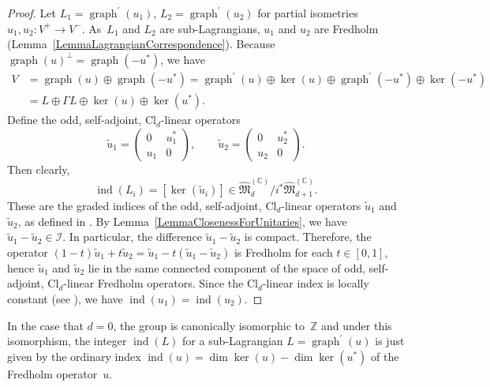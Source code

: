 \documentclass[pdftex]{sigma}
\numberwithin{equation}{section}
\DeclareMathOperator{\graph}{\mathrm{graph}}
\newcommand{\Z}{\mathbb{Z}}
\newcommand{\C}{\mathbb{C}}
\newcommand{\ind}{\operatorname{ind}}
\newcommand{\Cl}{\mathrm{Cl}}
\begin{document}
\begin{proof}
 Let $L_1 = \graph^\prime(u_1)$, $L_2 = \graph^\prime(u_2)$ for partial isometries $u_1, u_2 \colon V^+ \to V^-$.
 As~$L_1$ and $L_2$ are sub-Lagrangians, ${u}_1$ and ${u}_2$ are Fredholm (Lemma~\ref{LemmaLagrangianCorrespondence}).
 Because $\graph(u)^\perp = \graph(-u^*)$, we have
\begin{align*}
V &= \graph (u) \oplus \graph(-u^*) = \graph^\prime(u) \oplus \ker(u) \oplus \graph^\prime(-u^*) \oplus \ker(-u^*)\\
&= L \oplus \Gamma L \oplus \ker(u) \oplus \ker(u^*).
\end{align*}
 Define the odd, self-adjoint, $\Cl_d$-linear operators
 \begin{equation*}
 \tilde{u}_1 = \begin{pmatrix} 0 & u_1^* \\ u_1 & 0 \end{pmatrix}, \qquad \tilde{u}_2 = \begin{pmatrix} 0 & u_2^* \\ u_2 & 0 \end{pmatrix}.
 \end{equation*}
 Then clearly,
 \begin{equation*}
 \ind(L_i) = [\ker(\tilde{u}_i)] \in \hat{\mathfrak{M}}^{(\C)}_d / i^*\hat{\mathfrak{M}}^{(\C)}_{d+1}.
 \end{equation*}
 These are the graded indices of the odd, self-adjoint, $\Cl_d$-linear operators $\tilde{u}_1$ and $\tilde{u}_2$, as defined in \cite[Section~III.10]{LawsonMichelsohn}.
 By Lemma~\ref{LemmaClosenessForUnitaries}, we have $\tilde{u}_1 - \tilde{u}_2 \in \mathcal{I}$.
 In particular, the difference $\tilde{u}_1 - \tilde{u}_2$ is compact.
 Therefore, the operator $(1-t) \tilde{u}_1 + t \tilde{u}_2 = \tilde{u}_1 - t(\tilde{u}_1 - \tilde{u}_2)$ is Fredholm for each $t \in [0, 1]$, hence $\tilde{u}_1$ and $\tilde{u}_2$ lie in the same connected component of the space of odd, self-adjoint, $\Cl_d$-linear Fredholm operators.
 Since the $\Cl_d$-linear index is locally constant (see \cite[Proposition~III.10.6]{LawsonMichelsohn}), we have $\ind(u_1) = \ind(u_2)$.
\end{proof}

\begin{Example}
In the case that $d=0$, the group \smash{$\mathfrak{M}_0^{(\C)} / i^* \mathfrak{M}_1^{(\C)}$} is canonically isomorphic to~$\Z$ and under this isomorphism, the integer $\ind(L)$ for a sub-Lagrangian $L = \graph^\prime(u)$ is just given by the ordinary index $\ind(u) = \dim\ker(u) - \dim\ker(u^*)$ of the Fredholm operator~$u$.
\end{Example}
\end{document}
